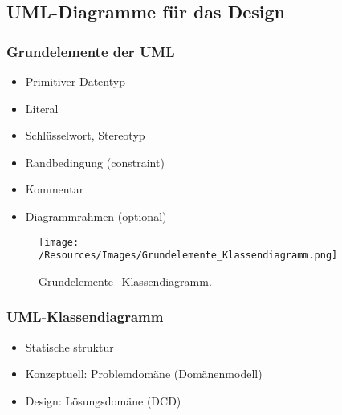 \documentclass[../ZF_SWEN1.tex]{subfiles}
\begin{document}
\subsection{UML-Diagramme für das Design}
\subsubsection{Grundelemente der UML}
\begin{itemize}
	\item Primitiver Datentyp
	\item Literal
	\item Schlüsselwort, Stereotyp
	\item Randbedingung (constraint)
	\item Kommentar
	\item Diagrammrahmen (optional)
\end{itemize}

\begin{figure}[H]
\centering
\texttt{[image: /Resources/Images/Grundelemente\_Klassendiagramm.png]}
\caption{\label{fig:Grundelemente_Klassendiagramm}Grundelemente\_Klassendiagramm.}
\end{figure}

\subsubsection{UML-Klassendiagramm}
\begin{itemize}
	\item Statische struktur
	\item Konzeptuell: Problemdomäne (Domänenmodell)
	\item Design: Lösungsdomäne (DCD)
\end{itemize}
\end{document}
